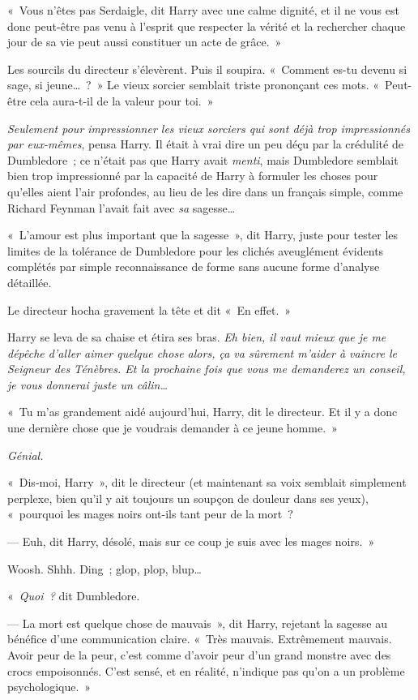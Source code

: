 «~Vous n'êtes pas Serdaigle, dit Harry avec une calme dignité, et il ne vous est donc peut-être pas venu à l'esprit que respecter la vérité et la rechercher chaque jour de sa vie peut aussi constituer un acte de grâce.~»

Les sourcils du directeur s'élevèrent. Puis il soupira. «~Comment es-tu devenu si sage, si jeune…~?~» Le vieux sorcier semblait triste prononçant ces mots. «~Peut-être cela aura-t-il de la valeur pour toi.~»

\emph{Seulement pour impressionner les vieux sorciers qui sont déjà trop impressionnés par eux-mêmes}, pensa Harry. Il était à vrai dire un peu déçu par la crédulité de Dumbledore~; ce n'était pas que Harry avait \emph{menti}, mais Dumbledore semblait bien trop impressionné par la capacité de Harry à formuler les choses pour qu'elles aient l'air profondes, au lieu de les dire dans un français simple, comme Richard Feynman l'avait fait avec \emph{sa} sagesse…

«~L'amour est plus important que la sagesse~», dit Harry, juste pour tester les limites de la tolérance de Dumbledore pour les clichés aveuglément évidents complétés par simple reconnaissance de forme sans aucune forme d'analyse détaillée.

Le directeur hocha gravement la tête et dit «~En effet.~»

Harry se leva de sa chaise et étira ses bras. \emph{Eh bien, il vaut mieux que je me dépêche d'aller aimer quelque chose alors, ça va sûrement m'aider à vaincre le Seigneur des Ténèbres. Et la prochaine fois que vous me demanderez un conseil, je vous donnerai juste un câlin…}

«~Tu m'as grandement aidé aujourd'hui, Harry, dit le directeur. Et il y a donc une dernière chose que je voudrais demander à ce jeune homme.~»

\emph{Génial.}

«~Dis-moi, Harry~», dit le directeur (et maintenant sa voix semblait simplement perplexe, bien qu'il y ait toujours un soupçon de douleur dans ses yeux), «~pourquoi les mages noirs ont-ils tant peur de la mort~?

--- Euh, dit Harry, désolé, mais sur ce coup je suis avec les mages noirs.~»

Woosh. Shhh. Ding~; glop, plop, blup…

«~\emph{Quoi~?} dit Dumbledore.

--- La mort est quelque chose de mauvais~», dit Harry, rejetant la sagesse au bénéfice d'une communication claire. «~Très mauvais. Extrêmement mauvais. Avoir peur de la peur, c'est comme d'avoir peur d'un grand monstre avec des crocs empoisonnés. C'est sensé, et en réalité, n'indique pas qu'on a un problème psychologique.~»

